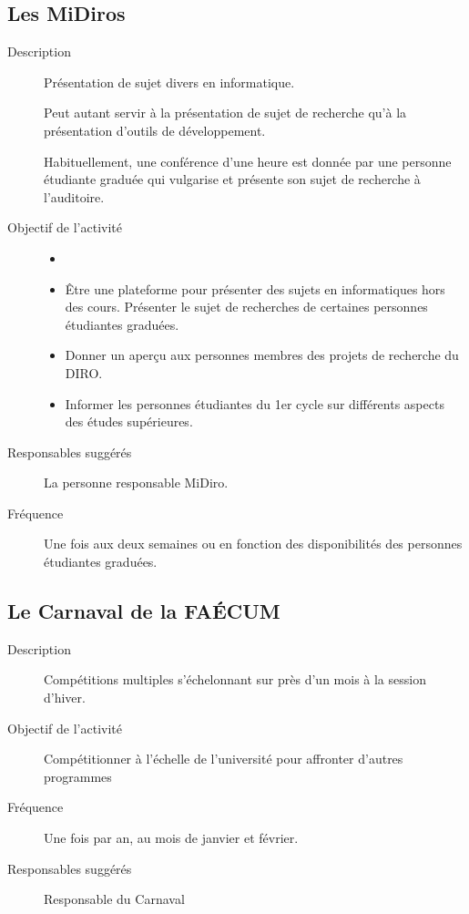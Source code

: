\documentclass{aediroum}
\begin{document}
\subsection{Les MiDiros}
\begin{description}
	\item[Description] Présentation de sujet divers en informatique.

	Peut autant servir à la présentation de sujet de recherche qu'à la présentation d'outils de développement.

	Habituellement, une conférence d'une heure est donnée par une personne étudiante graduée qui vulgarise et présente son sujet de recherche à l’auditoire.
	\item[Objectif de l'activité]
	\begin{itemize}
		\item[]
		\item Être une plateforme pour présenter des sujets en informatiques hors des cours. Présenter le sujet de recherches de certaines personnes étudiantes graduées.
		\item Donner un aperçu aux personnes membres des projets de recherche du DIRO.
		\item Informer les personnes étudiantes du 1er cycle sur différents aspects des études supérieures.
	\end{itemize}
	\item[Responsables suggérés] La personne responsable MiDiro.
 	\item[Fréquence] Une fois aux deux semaines ou en fonction des disponibilités des personnes étudiantes graduées.
\end{description}

\subsection{Le Carnaval de la FAÉCUM}
\begin{description}
	\item[Description] Compétitions multiples s'échelonnant sur près d'un mois à la session d'hiver.
	\item[Objectif de l'activité] Compétitionner à l'échelle de l'université pour affronter d'autres programmes
	\item[Fréquence] Une fois par an, au mois de janvier et février.
	\item[Responsables suggérés] Responsable du Carnaval
\end{description}
\end{document}
